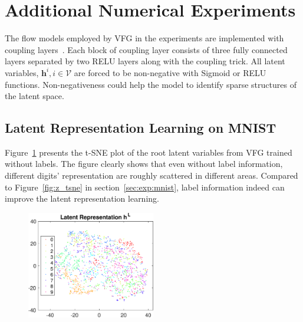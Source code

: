 \documentclass[twoside]{article}
\begin{document}
\section{Additional Numerical Experiments}
The flow models employed by VFG in the experiments are implemented with coupling layers~\cite{Dinh2016DensityEU}. Each block of coupling layer consists of three fully connected layers separated by two RELU layers along with the coupling trick. All latent variables, $\mathbf{h}^{i}, i \in \mathcal{V}$ are forced to be non-negative with Sigmoid or RELU functions. Non-negativeness could help the model to identify sparse structures of the latent space. %

\subsection{Latent Representation Learning on MNIST}
Figure~\ref{fig:z_no_Y} presents the t-SNE plot of the root latent variables from VFG trained without labels. The figure clearly shows that even without label information, different digits' representation are roughly scattered in different areas.  Compared to Figure~\ref{fig:z_tsne} in section~\ref{sec:exp:mnist}, label information indeed can improve the latent representation learning. 
\begin{figure}[H]
    \centering
       \includegraphics[width=0.5\textwidth]{fig/z_no_Y_2.eps}
    \label{fig:z_no_Y}
\end{figure}
 
\end{document}
